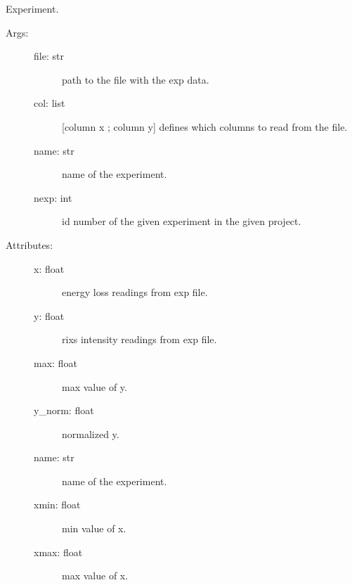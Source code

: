 \documentclass[letterpaper,10pt,english]{sphinxmanual}
\begin{document}
\begin{fulllineitems}
\label{\detokenize{modules/experiment:phlab.experiment.experiment}}
Experiment.
\begin{description}
\item[{Args:}] \leavevmode\begin{description}
\item[{file: str}] \leavevmode
path to the file with the exp data.

\item[{col: list}] \leavevmode
{[}column x ; column y{]} defines which columns to read from the file.

\item[{name: str}] \leavevmode
name of the experiment.

\item[{nexp: int}] \leavevmode
id number of the given experiment in the given project.

\end{description}

\item[{Attributes:}] \leavevmode\begin{description}
\item[{x: float}] \leavevmode
energy loss readings from exp file.

\item[{y: float}] \leavevmode
rixs intensity readings from  exp file.

\item[{max: float}] \leavevmode
max value of y.

\item[{y\_norm: float}] \leavevmode
normalized y.

\item[{name: str}] \leavevmode
name of the experiment.

\item[{xmin: float}] \leavevmode
min value of x.

\item[{xmax: float}] \leavevmode
max value of x.

\end{description}

\end{description}

\end{fulllineitems}
\end{document}
